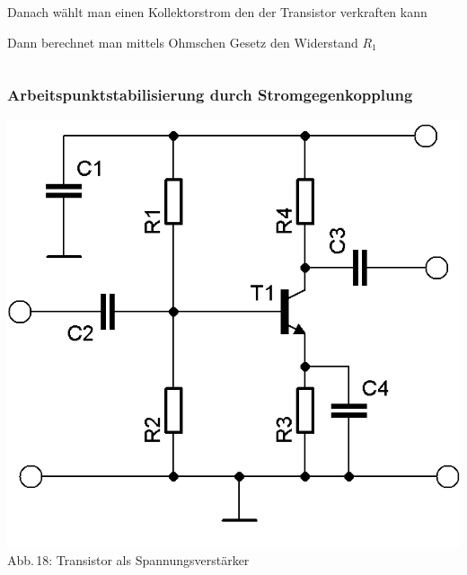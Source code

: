 \begin{frame}
\begin{columns}
\begin{itemize}
{      \item Danach wählt man einen Kollektorstrom den der Transistor verkraften kann
      \item Dann berechnet man mittels Ohmschen Gesetz den Widerstand $R_1$
	}
    \end{itemize}
  \end{columns}
\end{frame}

\begin{frame}
	\frametitle{Arbeitspunktstabilisierung durch Stromgegenkopplung}
	\begin{minipage}{0.4\textwidth}
	\begin{center}
		\includegraphics[width=\textwidth,height=.85\textheight,keepaspectratio]{a06/Transistor-Verstaerker-APstab1.png}\\
		{\tiny Abb.\,18: Transistor als Spannungsverstärker~\cite{bnetza}}
	\end{center}
      \end{minipage}
      \hspace{3mm}

\end{frame}
